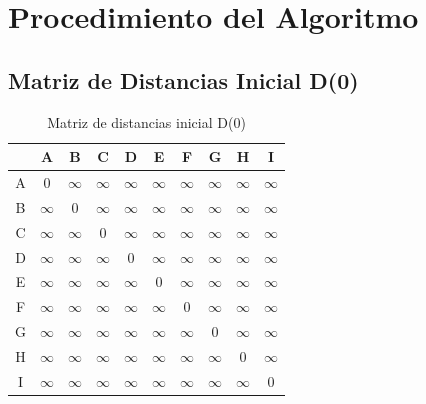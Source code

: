 \documentclass[12pt]{article}
\begin{document}
\clearpage
\section{Procedimiento del Algoritmo}
\subsection{Matriz de Distancias Inicial D(0)}
\begin{table}[h!]
\centering
\begin{tabular}{|c|c|c|c|c|c|c|c|c|c|}
\hline
 & A & B & C & D & E & F & G & H & I \\\hline
A & 0 & $\infty$ & $\infty$ & $\infty$ & $\infty$ & $\infty$ & $\infty$ & $\infty$ & $\infty$ \\\hline
B & $\infty$ & 0 & $\infty$ & $\infty$ & $\infty$ & $\infty$ & $\infty$ & $\infty$ & $\infty$ \\\hline
C & $\infty$ & $\infty$ & 0 & $\infty$ & $\infty$ & $\infty$ & $\infty$ & $\infty$ & $\infty$ \\\hline
D & $\infty$ & $\infty$ & $\infty$ & 0 & $\infty$ & $\infty$ & $\infty$ & $\infty$ & $\infty$ \\\hline
E & $\infty$ & $\infty$ & $\infty$ & $\infty$ & 0 & $\infty$ & $\infty$ & $\infty$ & $\infty$ \\\hline
F & $\infty$ & $\infty$ & $\infty$ & $\infty$ & $\infty$ & 0 & $\infty$ & $\infty$ & $\infty$ \\\hline
G & $\infty$ & $\infty$ & $\infty$ & $\infty$ & $\infty$ & $\infty$ & 0 & $\infty$ & $\infty$ \\\hline
H & $\infty$ & $\infty$ & $\infty$ & $\infty$ & $\infty$ & $\infty$ & $\infty$ & 0 & $\infty$ \\\hline
I & $\infty$ & $\infty$ & $\infty$ & $\infty$ & $\infty$ & $\infty$ & $\infty$ & $\infty$ & 0 \\\hline
\end{tabular}
\caption{Matriz de distancias inicial D(0)}
\end{table}

\clearpage
\end{document}
